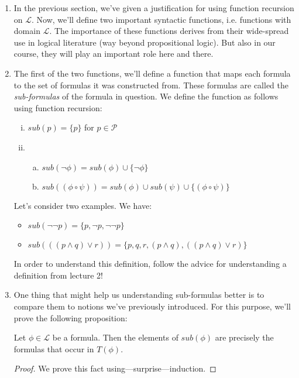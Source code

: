 	\begin{enumerate}[\thesection.1]

		\item In the previous section, we've given a justification for using function recursion on $\mathcal{L}$. Now, we'll define two important syntactic functions, i.e. functions with domain $\mathcal{L}$. The importance of these functions derives from their wide-spread use in logical literature (way beyond propositional logic). But also in our course, they will play an important role here and there.
		
	  \item The first of the two functions, we'll define a function that maps each formula to the set of formulas it was constructed from.
		These formulas are called the \emph{sub-formulas} of the formula in question.
		We define the function as follows using function recursion:
		\begin{enumerate}[(i)]
		  \item%
			$sub(p)=\{p\}$ for $p\in\mathcal{P}$
		  \item%
			\begin{enumerate}[(a)]
			  \item%
				$sub(\neg\phi)= sub(\phi)\cup\{\neg \phi\}$
			  \item%
				$sub((\phi\circ\psi))= sub(\phi)\cup sub(\psi)\cup\{(\phi\circ\psi)\}$
			\end{enumerate}
		\end{enumerate}
		Let's consider two examples.
		We have:
		\begin{itemize}
		  \item%
			$sub(\neg \neg p)=\{p,\neg p, \neg\neg p\}$
		  \item%
			$sub(((p\land q)\lor r))=\{p,q,r,(p\land q), ((p\land q)\lor r)\}$
		\end{itemize}
		In order to understand this definition,
		follow the advice for understanding a definition from lecture 2!

	\item One thing that might help us understanding sub-formulas better is to compare them to notions we've previously introduced. For this purpose, we'll prove the following proposition:
	
		\begin{proposition}
		Let $\phi\in\mathcal{L}$ be a formula. Then the elements of $sub(\phi)$ are precisely the formulas that occur in $T(\phi)$.
		\end{proposition}
		\begin{proof}
		We prove this fact using---surprise---induction.
		

\end{proof}
\end{enumerate}
